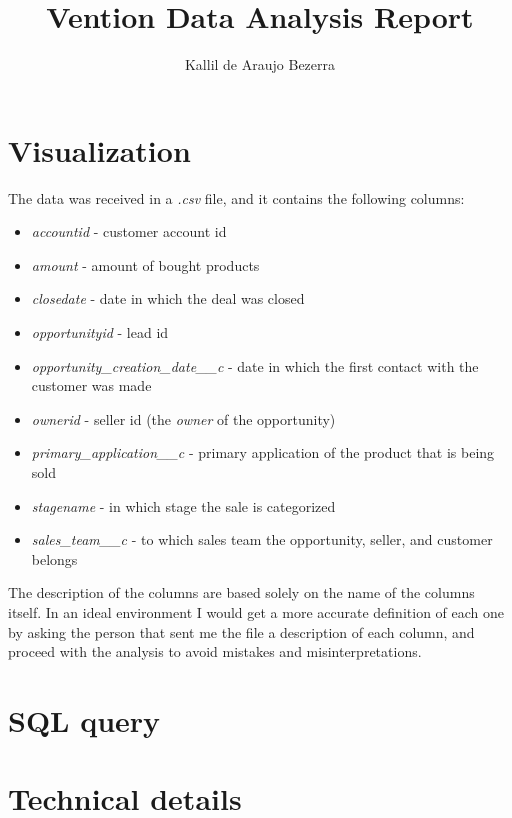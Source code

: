 \documentclass[]{report}
\title{Vention Data Analysis Report}
\author{Kallil de Araujo Bezerra}
\begin{document}
\maketitle


\tableofcontents

\chapter{Visualization}

The data was received in a \textit{.csv} file, and it contains the following columns:

\begin{itemize}
	\item \textit{accountid} - customer account id
	\item \textit{amount} - amount of bought products
	\item \textit{closedate} - date in which the deal was closed
	\item \textit{opportunityid} - lead id
	\item \textit{opportunity\_creation\_date\_\_c} - date in which the first contact with the customer was made
	\item \textit{ownerid} - seller id (the \textit{owner} of the opportunity)
	\item \textit{primary\_application\_\_c} - primary application of the product that is being sold
	\item \textit{stagename} - in which stage the sale is categorized
	\item \textit{sales\_team\_\_c} - to which sales team the opportunity, seller, and customer belongs
\end{itemize}

The description of the columns are based solely on the name of the columns itself. In an ideal environment I would get a more accurate definition of each one by asking the person that sent me the file a description of each column, and proceed with the analysis to avoid mistakes and misinterpretations.

\chapter{SQL query}

\chapter{Technical details}
\end{document}
